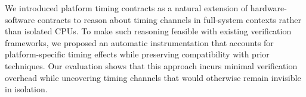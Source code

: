 We introduced platform timing contracts as a natural extension of hardware-software contracts to reason about timing channels in full-system contexts rather than isolated CPUs.
To make such reasoning feasible with existing verification frameworks, we proposed an automatic instrumentation that accounts for platform-specific timing effects while preserving compatibility with prior techniques.
Our evaluation shows that this approach incurs minimal verification overhead while uncovering timing channels that would otherwise remain invisible in isolation.
